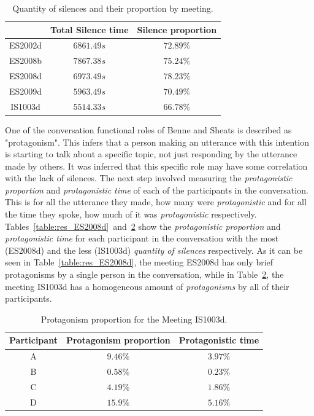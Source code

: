\begin{table}[H]
    \centering
    \begin{tabular}{ccc}
        \hline    
        & Total Silence time & Silence proportion \\ \hline
        ES2002d & $6861.49s$         & $72.89\%$  \\
        ES2008b & $7867.38s$         & $75.24\%$  \\
        ES2008d & $6973.49s$         & $78.23\%$  \\
        ES2009d & $5963.49s$         & $70.49\%$  \\
        IS1003d & $5514.33s$         & $66.78\%$  \\
        \hline
    \end{tabular}
    \caption{Quantity of silences and their proportion by meeting.}
    \label{table:ami_times}
\end{table}

One of the conversation functional roles of Benne and Sheats is described as "protagonism". This infers that a person making an utterance with this intention is starting to talk about a specific topic, not just responding by the utterance made by others. It was inferred that this specific role may have some correlation with the lack of silences. The next step involved measuring the \textit{protagonistic proportion} and \textit{protagonistic time} of each of the participants in the conversation. This is for all the utterance they made, how many were \textit{protagonistic} and for all the time they spoke, how much of it was \textit{protagonistic} respectively.\\

Tables~\ref{table:res_ES2008d}~and~\ref{table:res_IS1003d} show the \textit{protagonistic proportion} and \textit{protagonistic time} for each participant in the conversation with the most (ES2008d) and the less (IS1003d) \textit{quantity of silences} respectively. As it can be seen in Table~\ref{table:res_ES2008d}, the meeting ES2008d has only brief protagonisms by a single person in the conversation, while in Table~\ref{table:res_IS1003d}, the meeting IS1003d has a homogeneous amount of \textit{protagonisms} by all of their participants.\\

\begin{table}[H]
    \centering
    \begin{tabular}{ccc}
    \hline
    Participant & Protagonism proportion & Protagonistic time \\ \hline
    A           & $9.46\%$                & $3.97\%$            \\
    B           & $0.58\%$                & $0.23\%$            \\
    C           & $4.19\%$                & $1.86\%$            \\
    D           & $15.9\%$                & $5.16\%$
             \\
    \hline
    \end{tabular}
    \caption{Protagonism proportion for the Meeting IS1003d.}
    \label{table:res_IS1003d}
\end{table}

